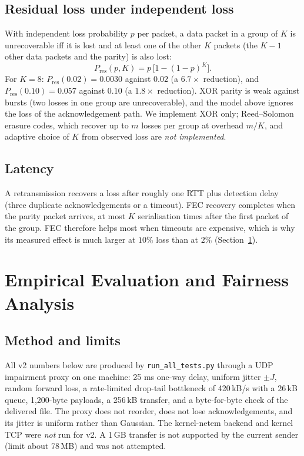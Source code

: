 \subsection{Residual loss under independent loss}
With independent loss probability $p$ per packet, a data packet in a group of $K$ is unrecoverable iff it is lost and at least one of the other $K$ packets (the $K-1$ other data packets and the parity) is also lost:
\begin{equation}
P_{\mathrm{res}}(p,K)=p\,\bigl[1-(1-p)^{K}\bigr].
\end{equation}
For $K=8$: $P_{\mathrm{res}}(0.02)=0.0030$ against $0.02$ (a $6.7\times$ reduction), and $P_{\mathrm{res}}(0.10)=0.057$ against $0.10$ (a $1.8\times$ reduction). XOR parity is weak against bursts (two losses in one group are unrecoverable), and the model above ignores the loss of the acknowledgement path. We implement XOR only; Reed--Solomon erasure codes, which recover up to $m$ losses per group at overhead $m/K$, and adaptive choice of $K$ from observed loss are \emph{not implemented}.

\subsection{Latency}
A retransmission recovers a loss after roughly one RTT plus detection delay (three duplicate acknowledgements or a timeout). FEC recovery completes when the parity packet arrives, at most $K$ serialisation times after the first packet of the group. FEC therefore helps most when timeouts are expensive, which is why its measured effect is much larger at $10\%$ loss than at $2\%$ (Section~\ref{sec:eval}).

\section{Empirical Evaluation and Fairness Analysis}
\label{sec:eval}
\subsection{Method and limits}
All v2 numbers below are produced by \texttt{run\_all\_tests.py} through a UDP impairment proxy on one machine: 25 ms one-way delay, uniform jitter $\pm J$, random forward loss, a rate-limited drop-tail bottleneck of 420\,kB/s with a 26\,kB queue, 1{,}200-byte payloads, a 256\,kB transfer, and a byte-for-byte check of the delivered file. The proxy does not reorder, does not lose acknowledgements, and its jitter is uniform rather than Gaussian. The kernel-netem backend and kernel TCP were \emph{not} run for v2. A 1\,GB transfer is not supported by the current sender (limit about 78\,MB) and was not attempted.

